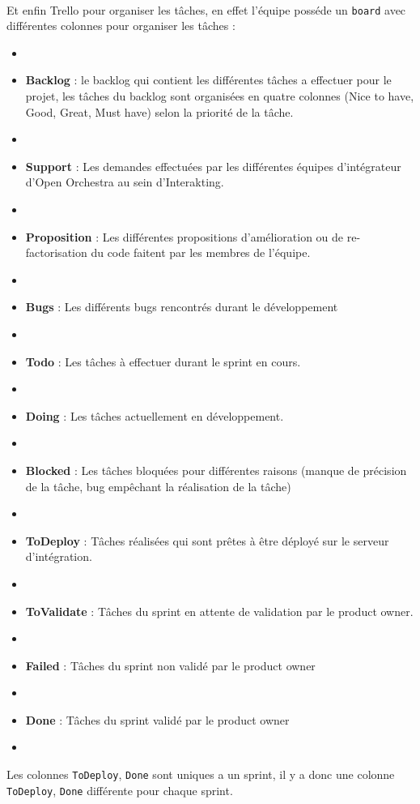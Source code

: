   \paragraph{}
 Et enfin Trello pour organiser les tâches, en effet l'équipe posséde un \verb?board? avec différentes colonnes pour organiser les tâches : 
 \begin{itemize}
 \item[]
 \item \textbf{Backlog} : le backlog qui contient les différentes tâches a effectuer pour le projet, les tâches du backlog sont organisées en quatre colonnes (Nice to have, Good, Great, Must have) selon la priorité de la tâche.
 \item[]
 \item \textbf{Support} : Les demandes effectuées par les différentes équipes d'intégrateur d'Open Orchestra au sein d'Interakting.
\item[]
 \item \textbf{Proposition} : Les différentes propositions d'amélioration ou de re-factorisation du code faitent par les membres de l'équipe.
\item[]
 \item \textbf{Bugs} : Les différents bugs rencontrés durant le développement
\item[]
 \item \textbf{Todo} : Les tâches à effectuer durant le sprint en cours.
\item[]
 \item \textbf{Doing} : Les tâches actuellement en développement.
\item[]
 \item \textbf{Blocked} : Les tâches bloquées pour différentes raisons (manque de précision de la tâche, bug empêchant la réalisation de la tâche)
\item[]
 \item \textbf{ToDeploy} : Tâches réalisées qui sont prêtes à être déployé sur le serveur d'intégration.
\item[]
 \item \textbf{ToValidate} : Tâches du sprint en attente de validation par le product owner.
\item[]
 \item \textbf{Failed} : Tâches du sprint non validé par le product owner
\item[]
 \item \textbf{Done} : Tâches du sprint validé par le product owner
 \item[]
 \end{itemize}
Les colonnes \verb?ToDeploy?, \verb?Done? sont uniques a un sprint, il y a donc une colonne \verb?ToDeploy?, \verb?Done? différente pour chaque sprint.
